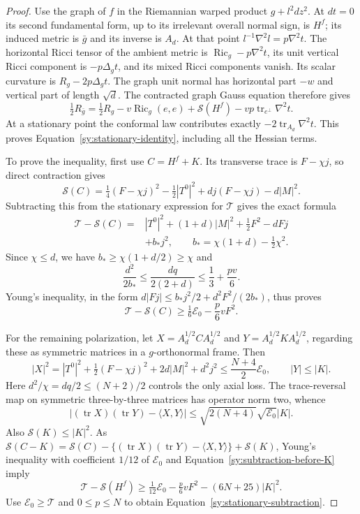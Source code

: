 \begin{proof}
Use the graph of $f$ in the Riemannian warped product
$g+l^2dz^2$.  At $dt=0$ its second fundamental form, up to its
irrelevant overall normal sign, is $H^f$; its induced metric is
$\bar g$ and its inverse is $A_d$.
At that point $l^{-1}\nabla^2l=p\nabla^2t$.
The horizontal Ricci tensor of the ambient metric is
$\operatorname{Ric}_g-p\nabla^2t$, its unit vertical Ricci component
is $-p\Delta_gt$, and its mixed Ricci components vanish.  Its scalar
curvature is $R_g-2p\Delta_gt$.
The graph unit normal has horizontal part $-w$ and vertical part of
length $\sqrt d$.  The contracted graph Gauss equation therefore gives
\[
 \tfrac12R_{\bar g}
 =\tfrac12R_g-v\operatorname{Ric}_g(e,e)+\mathcal S(H^f)
      -vp\operatorname{tr}_{e^\perp}\nabla^2t.
\]
At a stationary point the conformal law contributes exactly
$-2\operatorname{tr}_{A_d}\nabla^2t$.
This proves Equation~\ref{sy:stationary-identity}, including all
the Hessian terms.

To prove the inequality, first use $C=H^f+K$.
Its transverse trace is $F-\chi j$, so direct contraction gives
\[
 \mathcal S(C)=\tfrac14(F-\chi j)^2-\tfrac12|T^0|^2
                     +dj(F-\chi j)-d|M|^2.
\]
Subtracting this from the stationary expression for $\mathcal T$
gives the exact formula
\begin{equation}\label{sy:exact-subtraction}
\begin{aligned}
 \mathcal T-\mathcal S(C)
 ={}&|T^0|^2+(1+d)|M|^2+\tfrac12F^2-dFj\\
 &+b_*j^2,\qquad b_*=\chi(1+d)-\tfrac12\chi^2.
\end{aligned}
\end{equation}
Since $\chi\le d$, we have $b_*\ge\chi(1+d/2)\ge\chi$ and
\[
 \frac{d^2}{2b_*}
 \le\frac{dq}{2(2+d)}
 \le\frac13+\frac{pv}{6}.
\]
Young's inequality, in the form
$d|Fj|\le b_*j^2/2+d^2F^2/(2b_*)$, thus proves
\begin{equation}\label{sy:subtraction-before-K}
 \mathcal T-\mathcal S(C)
 \ge\tfrac16\mathcal E_0-\frac p6vF^2.
\end{equation}

For the remaining polarization, let
$X=A_d^{1/2}CA_d^{1/2}$ and
$Y=A_d^{1/2}KA_d^{1/2}$, regarding these as symmetric matrices in a
$g$-orthonormal frame.  Then
\[
 |X|^2=|T^0|^2+\tfrac12(F-\chi j)^2+2d|M|^2+d^2j^2
 \le\frac{N+4}{2}\mathcal E_0,
 \qquad |Y|\le|K|.
\]
Here $d^2/\chi=dq/2\le(N+2)/2$ controls the only axial loss.
The trace-reversal map on symmetric three-by-three matrices has
operator norm two, whence
\[
 |(\operatorname{tr}X)(\operatorname{tr}Y)-\langle X,Y\rangle|
 \le\sqrt{2(N+4)}\sqrt{\mathcal E_0}|K|.
\]
Also $\mathcal S(K)\le|K|^2$.  As
$\mathcal S(C-K)=\mathcal S(C)
 -\{(\operatorname{tr}X)(\operatorname{tr}Y)-\langle X,Y\rangle\}
 +\mathcal S(K)$, Young's inequality with coefficient $1/12$ of
$\mathcal E_0$ and Equation~\ref{sy:subtraction-before-K} imply
\[
 \mathcal T-\mathcal S(H^f)
 \ge\tfrac1{12}\mathcal E_0-\tfrac p6vF^2-(6N+25)|K|^2.
\]
Use $\mathcal E_0\ge\mathcal T$ and $0\le p\le N$ to obtain
Equation~\ref{sy:stationary-subtraction}.
\end{proof}

